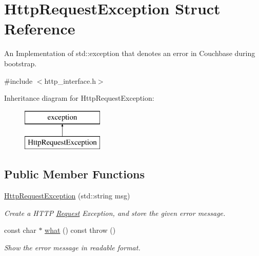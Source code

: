 \hypertarget{structHttpRequestException}{\section{Http\-Request\-Exception Struct Reference}
\label{structHttpRequestException}
}


An Implementation of std\-::exception that denotes an error in Couchbase during bootstrap.  




{\ttfamily \#include $<$http\-\_\-interface.\-h$>$}

Inheritance diagram for Http\-Request\-Exception\-:\begin{figure}[H]
\begin{center}
\leavevmode
\includegraphics[height=2.000000cm]{structHttpRequestException}
\end{center}
\end{figure}
\subsection*{Public Member Functions}
\begin{DoxyCompactItemize}
\item 
\hypertarget{structHttpRequestException_a8470fe285f8e7f0939b5068546967764}{\hyperlink{structHttpRequestException_a8470fe285f8e7f0939b5068546967764}{Http\-Request\-Exception} (std\-::string msg)}\label{structHttpRequestException_a8470fe285f8e7f0939b5068546967764}

\begin{DoxyCompactList}\small\item\em Create a H\-T\-T\-P \hyperlink{structRequest}{Request} Exception, and store the given error message. \end{DoxyCompactList}\item 
\hypertarget{structHttpRequestException_acf07a2f7382157a27c0c5d2cedb2f2e6}{const char $\ast$ \hyperlink{structHttpRequestException_acf07a2f7382157a27c0c5d2cedb2f2e6}{what} () const   throw ()}\label{structHttpRequestException_acf07a2f7382157a27c0c5d2cedb2f2e6}

\begin{DoxyCompactList}\small\item\em Show the error message in readable format. \end{DoxyCompactList}\end{DoxyCompactItemize}
